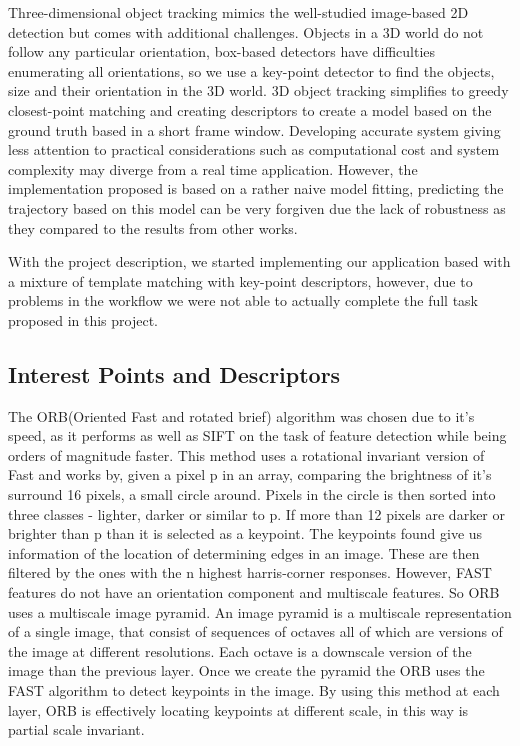 \documentclass[conference]{IEEEtran}
\begin{document}
 Three-dimensional object tracking mimics the well-studied image-based 2D detection but comes with additional challenges. Objects in a 3D world do not follow any particular orientation, box-based detectors have difficulties enumerating all orientations, so we use a key-point detector to find the objects, size and their orientation in the 3D world. 3D object tracking simplifies to greedy closest-point matching and creating descriptors to create a model based on the ground truth based in a short frame window. Developing accurate system giving less attention to practical considerations such as computational cost and system complexity may diverge from a real time application. However, the implementation proposed is based on a rather naive model fitting, predicting the trajectory based on this model can be very forgiven due the lack of robustness as they compared to the results from other works. 


With the project description, we started implementing our application based with a mixture of template matching with key-point descriptors, however, due to problems in the workflow we were not able to actually complete the full task proposed in this project.


\subsection{Interest Points and Descriptors}
The ORB(Oriented Fast and rotated brief) algorithm was chosen due to it's speed, as it performs as well as SIFT on the task of feature detection while being orders of magnitude faster.  This method uses a rotational invariant version of Fast and works by, given a pixel p in an array, comparing the brightness of it's surround 16 pixels, a small circle around. Pixels in the circle is then sorted into three classes - lighter, darker or similar to p. If more than 12 pixels are darker or brighter than p than it is selected as a keypoint. The keypoints found give us information of the location of determining edges in an image. These are then filtered by the ones with the n highest harris-corner responses. However, FAST features do not have an orientation component and multiscale features. So ORB uses a multiscale image pyramid. An image pyramid is a multiscale representation of a single image, that consist of sequences of octaves all of which are versions of the image at different resolutions. Each octave is a downscale version of the image than the previous layer. Once we create the pyramid the ORB uses the FAST algorithm to detect keypoints in the image. By using this method at each layer, ORB is effectively locating keypoints at different scale, in this way is partial scale invariant.
\end{document}
